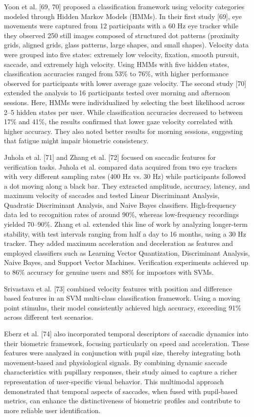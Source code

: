 \documentclass[12pt]{report}
\begin{document}
Yoon et al. [69, 70] proposed a classification framework using velocity categories modeled through Hidden Markov Models (HMMs). 
In their first study [69], eye movements were captured from 12 participants with a 60 Hz eye tracker while they observed 250 still images composed of structured dot patterns (proximity grids, aligned grids, glass patterns, large shapes, and small shapes).
Velocity data were grouped into five states: extremely low velocity, fixation, smooth pursuit, saccade, and extremely high velocity. 
Using HMMs with five hidden states, classification accuracies ranged from 53\% to 76\%, with higher performance observed for participants with lower average gaze velocity. 
The second study [70] extended the analysis to 16 participants tested over morning and afternoon sessions. 
Here, HMMs were individualized by selecting the best likelihood across 2–5 hidden states per user.
While classification accuracies decreased to between 17\% and 41\%, the results confirmed that lower gaze velocity correlated with higher accuracy. 
They also noted better results for morning sessions, suggesting that fatigue might impair biometric consistency.

Juhola et al. [71] and Zhang et al. [72] focused on saccadic features for verification tasks. Juhola et al. compared data acquired from two eye trackers with very different sampling rates (400 Hz vs. 30 Hz) while participants followed a dot moving along a black bar.
They extracted amplitude, accuracy, latency, and maximum velocity of saccades and tested Linear Discriminant Analysis, Quadratic Discriminant Analysis, and Naive Bayes classifiers. 
High-frequency data led to recognition rates of around 90\%, whereas low-frequency recordings yielded 70–90\%. 
Zhang et al. extended this line of work by analyzing longer-term stability, with test intervals ranging from half a day to 16 months, using a 30 Hz tracker.
They added maximum acceleration and deceleration as features and employed classifiers such as Learning Vector Quantization, Discriminant Analysis, Naive Bayes, and Support Vector Machines. 
Verification experiments achieved up to 86\% accuracy for genuine users and 88\% for impostors with SVMs.

Srivastava et al. [73] combined velocity features with position and difference based features in an SVM multi-class classification framework. 
Using a moving point stimulus, their model consistently achieved high accuracy, exceeding 91\% across different test scenarios.

Eberz et al. [74] also incorporated temporal descriptors of saccadic dynamics into their biometric framework, focusing particularly on speed and acceleration.
These features were analyzed in conjunction with pupil size, thereby integrating both movement-based and physiological signals.
By combining dynamic saccade characteristics with pupillary responses, their study aimed to capture a richer representation of user-specific visual behavior. 
This multimodal approach demonstrated that temporal aspects of saccades, when fused with pupil-based metrics, can enhance the distinctiveness of biometric profiles and contribute to more reliable user identification.
\end{document}
